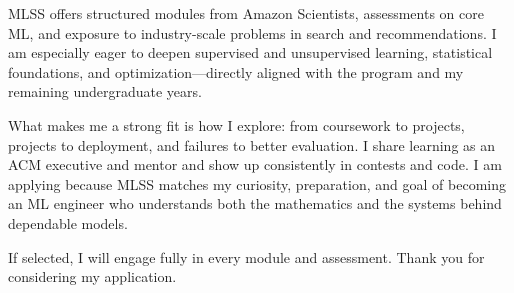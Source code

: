 \documentclass[a4paper,11pt]{article}
\begin{document}
MLSS offers structured modules from Amazon Scientists, assessments on core ML, and exposure to industry-scale problems in search and recommendations. I am especially eager to deepen supervised and unsupervised learning, statistical foundations, and optimization---directly aligned with the program and my remaining undergraduate years.

What makes me a strong fit is how I explore: from coursework to projects, projects to deployment, and failures to better evaluation. I share learning as an ACM executive and mentor and show up consistently in contests and code. I am applying because MLSS matches my curiosity, preparation, and goal of becoming an ML engineer who understands both the mathematics and the systems behind dependable models.

If selected, I will engage fully in every module and assessment. Thank you for considering my application.
\end{document}
